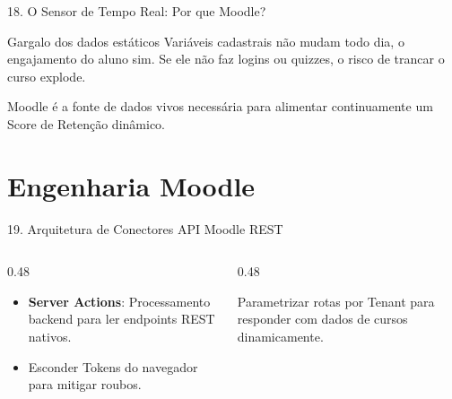 \documentclass[10pt, aspectratio=169]{beamer}
\begin{document}
\begin{frame}{18. O Sensor de Tempo Real: Por que Moodle?}
    \begin{alertblock}{Gargalo dos dados estáticos}
        Variáveis cadastrais não mudam todo dia, o engajamento do aluno sim. Se ele não faz logins ou quizzes, o risco de trancar o curso explode.
    \end{alertblock}
    \vspace{0.3cm}
    Moodle é a fonte de dados vivos necessária para alimentar continuamente um Score de Retenção dinâmico.
\end{frame}

\section{Engenharia Moodle}

\begin{frame}{19. Arquitetura de Conectores API Moodle REST}
    \begin{columns}[onlytextwidth]
        \begin{column}{0.48\textwidth}
            \begin{tcolorbox}[enhanced,title=Segurança Node,colback=black!30,colframe=ArkosGreen,fonttitle=\bfseries]
                \begin{itemize}
                    \item \textbf{Server Actions}: Processamento backend para ler endpoints REST nativos.
                    \item Esconder Tokens do navegador para mitigar roubos.
                \end{itemize}
            \end{tcolorbox}
        \end{column}
        \begin{column}{0.48\textwidth}
            \begin{tcolorbox}[enhanced,title=Buffer Handler,colback=black!30,colframe=cyan,fonttitle=\bfseries]
                Parametrizar rotas por Tenant para responder com dados de cursos dinamicamente.
            \end{tcolorbox}
        \end{column}
    \end{columns}
\end{frame}
\end{document}
